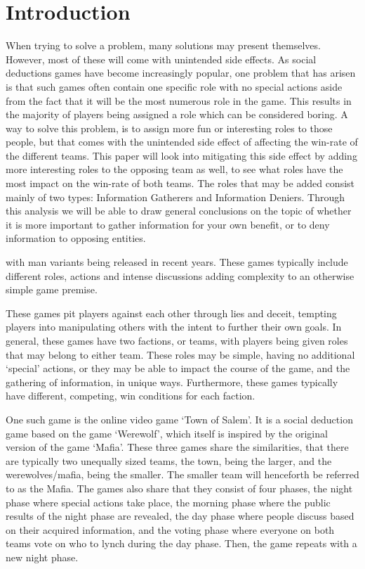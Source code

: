 \section{Introduction}
When trying to solve a problem, many solutions may present themselves. However, 
most of these  will come with unintended side effects. As social deductions 
games have become increasingly popular, one problem that has arisen is that 
such games often contain one specific role with no special actions aside from 
the fact that it will be the most numerous role in the game. This results in 
the majority of players being assigned a role which can be considered boring. A 
way to solve this problem, is to assign more fun or interesting roles to those 
people, but that comes with the unintended side effect of affecting the 
win-rate of the different teams. This paper will look into mitigating this side 
effect by adding more interesting roles to the opposing team as well, to see 
what roles have the most impact on the win-rate of both teams. The roles that 
may be added consist mainly of two types: Information Gatherers and Information 
Deniers. Through this analysis we will be able to draw general conclusions on 
the topic of whether it is more important to gather information for your own 
benefit, or to deny information to opposing entities. 

with man
variants being released in recent years. These games typically include
different roles, actions and intense discussions adding complexity to an
otherwise simple game premise.

These games pit players against each other through lies and deceit, tempting
players into manipulating others with the intent to further their own goals. In
general, these games have two factions, or teams, with players being given
roles that may belong to either team. These roles may be simple, having no
additional ‘special’ actions, or they may be able to impact the course of the
game, and the gathering of information, in unique ways. Furthermore, these
games typically have different, competing, win conditions for each faction.

One such game is the online video game ‘Town of Salem’. It is a social
deduction game based on the game ‘Werewolf’, which itself is inspired by the
original version of the game ‘Mafia’. These three games share the similarities,
that there are typically two unequally sized teams, the town, being the larger,
and the werewolves/mafia, being the smaller. The smaller team will henceforth
be referred to as the Mafia. The games also share that they consist of four
phases, the night phase where special actions take place, the morning phase
where the public results of the night phase are revealed, the day phase where
people discuss based on their acquired information, and the voting phase where
everyone on both teams vote on who to lynch during the day phase. Then, the
game repeats with a new night phase.

